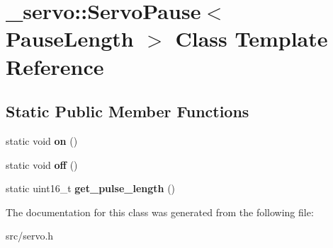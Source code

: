 \hypertarget{class__servo_1_1ServoPause}{}\section{\+\_\+servo\+:\+:Servo\+Pause$<$ Pause\+Length $>$ Class Template Reference}
\label{class__servo_1_1ServoPause}
\subsection*{Static Public Member Functions}
\begin{DoxyCompactItemize}
\item 
static void {\bfseries on} ()\hypertarget{class__servo_1_1ServoPause_a5ba24fe2aaf22387237dc508396a1446}{}\label{class__servo_1_1ServoPause_a5ba24fe2aaf22387237dc508396a1446}

\item 
static void {\bfseries off} ()\hypertarget{class__servo_1_1ServoPause_ae4ac75932cc1d1a66edd7df5f99459cb}{}\label{class__servo_1_1ServoPause_ae4ac75932cc1d1a66edd7df5f99459cb}

\item 
static uint16\+\_\+t {\bfseries get\+\_\+pulse\+\_\+length} ()\hypertarget{class__servo_1_1ServoPause_a6ef77748294ed41b40e04dad1f5fd019}{}\label{class__servo_1_1ServoPause_a6ef77748294ed41b40e04dad1f5fd019}

\end{DoxyCompactItemize}


The documentation for this class was generated from the following file\+:\begin{DoxyCompactItemize}
\item 
src/servo.\+h\end{DoxyCompactItemize}
